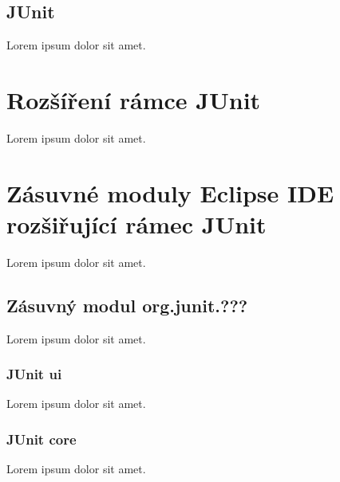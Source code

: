     \subsection{JUnit}
    Lorem ipsum dolor sit amet.
  
  \section{Rozšíření rámce JUnit}
  Lorem ipsum dolor sit amet.
  
  \section{Zásuvné moduly Eclipse IDE rozšiřující rámec JUnit}
  Lorem ipsum dolor sit amet.
    \subsection{Zásuvný modul org.junit.???}
    Lorem ipsum dolor sit amet.
    \subsubsection{JUnit ui}
    Lorem ipsum dolor sit amet.
    \subsubsection{JUnit core}
    Lorem ipsum dolor sit amet.
    
